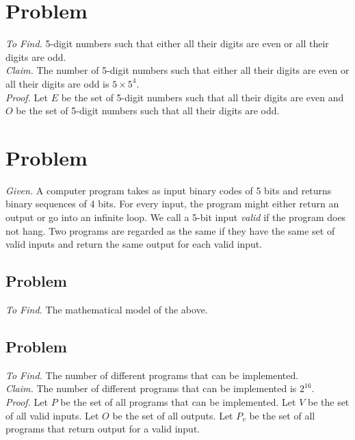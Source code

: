 \documentclass[11pt]{article}
\begin{document}




\section{Problem}
\emph{To Find. } 5-digit numbers such that either all their digits are even or all their digits are odd. \medskip \\
\emph{Claim. } The number of 5-digit numbers such that either all their digits are even or all their digits are odd is $5 \times 5^4$. \medskip \\
\emph{Proof. } Let $E$ be the set of 5-digit numbers such that all their digits are even and $O$ be the set of 5-digit numbers such that all their digits are odd.





\section{Problem}
\emph{Given. } A computer program takes as input binary codes of 5 bits and returns binary sequences of 4 bits. For every input, the program might either return an output or go into an infinite loop. We call a 5-bit input \emph{valid} if the program does not hang. Two programs are regarded as the same if they have the same set of valid inputs and return the same output for each valid input.

\subsection{Problem}
\emph{To Find. } The mathematical model of the above.

\subsection{Problem}
\emph{To Find. } The number of different programs that can be implemented. \medskip \\
\emph{Claim. } The number of different programs that can be implemented is $2^{16}$. \medskip \\
\emph{Proof. } Let $P$ be the set of all programs that can be implemented. Let $V$ be the set of all valid inputs. Let $O$ be the set of all outputs. Let $P_v$ be the set of all programs that return output for a valid input.
\end{document}
